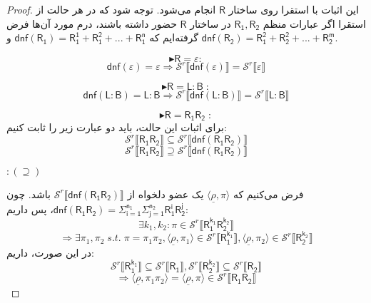\begin{proof}
	این اثبات با استقرا روی ساختار $\mathsf{R}$ انجام می‌شود.
	توجه شود که در هر حالت از استقرا اگر عبارات منظم 
	$\mathsf{R_1 , R_2}$
	در ساختار $\mathsf{R}$ حضور داشته باشند، درم مورد آن‌ها فرض گرفته‌ایم که 
	$\mathsf{dnf(R_1)=R_1^1+R_1^2+...+R_1^n}$
	و
	$\mathsf{dnf(R_2)=R_1^2+R_2^2+...+R_2^m}$.
		
	$$\blacktriangleright \mathsf{R=\varepsilon:}$$
	$$\mathsf{dnf}(\varepsilon)=\varepsilon \Rightarrow 
		\mathcal{S}^r \llbracket \mathsf{dnf(\varepsilon)} \rrbracket =
		\mathcal{S}^r \llbracket \varepsilon \rrbracket$$
	
	$$\blacktriangleright \mathsf{R=L:B\;:}$$
	$$\mathsf{dnf(L:B)=L:B} \Rightarrow 
	\mathcal{S}^r \llbracket \mathsf{dnf(L:B)} \rrbracket =
	\mathcal{S}^r \llbracket \mathsf{L:B} \rrbracket$$
	
	$$\blacktriangleright \mathsf{R=R_1 R_2\;:}$$
	برای اثبات این حالت، باید دو عبارت زیر را ثابت کنیم:
	$$\mathcal{S}^r \llbracket \mathsf{R_1 R_2} \rrbracket \subseteq
	  \mathcal{S}^r \llbracket \mathsf{dnf(R_1 R_2)} \rrbracket$$
	$$\mathcal{S}^r \llbracket \mathsf{R_1 R_2} \rrbracket \supseteq
	\mathcal{S}^r \llbracket \mathsf{dnf(R_1 R_2)} \rrbracket$$
	
	
	$:(\supseteq)$
	
	فرض می‌کنیم که 
	$\langle \underline{\rho} , \pi \rangle$ 
	یک عضو دلخواه از 
	$\mathcal{S}^r \llbracket \mathsf{dnf(R_1 R_2)} \rrbracket$
	باشد.
	چون 
	$\mathsf{dnf(R_1R_2)=} \mathsf{\Sigma_{i=1}^{n_1} \Sigma_{j=1}^{n_2} R_1^i R_2^j }$،
	 پس داریم:
	$$\exists k_1,k_2:
	\pi \in \mathcal{S}^r \llbracket \mathsf{R_1^{k_1} R_2^{k_2}} \rrbracket 
	$$
	$$\Rightarrow
	\exists \pi_1, \pi_2 \; s.t. \; \pi=\pi_1 \pi_2 , 
	\langle \underline{\rho} , \pi_1 \rangle \in \mathcal{S}^r \llbracket \mathsf{R_1^{k_1}} \rrbracket,
	\langle \underline{\rho} , \pi_2 \rangle \in \mathcal{S}^r \llbracket \mathsf{R_2^{k_2}} \rrbracket
	$$
	در این صورت، داریم:
	$$\mathcal{S}^r \llbracket \mathsf{R_1^{k_1}} \rrbracket \subseteq
	\mathcal{S}^r \llbracket \mathsf{R_1} \rrbracket,
	\mathcal{S}^r \llbracket \mathsf{R_2^{k_2}} \rrbracket \subseteq
	\mathcal{S}^r \llbracket \mathsf{R_2} \rrbracket$$
	$$
	\Rightarrow
	\langle \underline{\rho} , \pi_1 \pi_2 \rangle =
	\langle \underline{\rho} , \pi \rangle \in 
	\mathcal{S}^r \llbracket \mathsf{R_1 R_2} \rrbracket$$ 
	

\end{proof}

